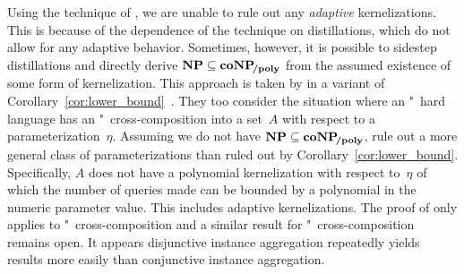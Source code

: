 Using the technique of \citeauthor{bodlaender2009problems}, we are unable to rule out any \emph{adaptive} kernelizations.
This is because of the dependence of the technique on distillations, which do not allow for any adaptive behavior.
Sometimes, however, it is possible to sidestep distillations and directly derive $\textnormal{\textbf{NP}} \subseteq \textnormal{\textbf{coNP}}\!_\textnormal{\textbf{/poly}}$ from the assumed existence of some form of kernelization.
This approach is taken by \citeauthor{dell2014satisfiability} in a variant of Corollary~\ref{cor:lower_bound}~\parencite[Lemma~1]{dell2014satisfiability}.
They too consider the situation where an "~hard language has an "~cross-composition into a set~$A$ with respect to a parameterization~$\eta$.
Assuming we do not have $\textnormal{\textbf{NP}} \subseteq \textnormal{\textbf{coNP}}\!_\textnormal{\textbf{/poly}}$, \citeauthor{dell2014satisfiability} rule out a more general class of parameterizations than ruled out by Corollary~\ref{cor:lower_bound}.
Specifically, $A$ does not have a polynomial kernelization with respect to~$\eta$ of which the number of queries made can be bounded by a polynomial in the numeric parameter value.
This includes adaptive kernelizations.
The proof of \citeauthor{dell2014satisfiability} only applies to "~cross-composition and a similar result for "~cross-composition remains open.
It appears disjunctive instance aggregation repeatedly yields results more easily than conjunctive instance aggregation.
